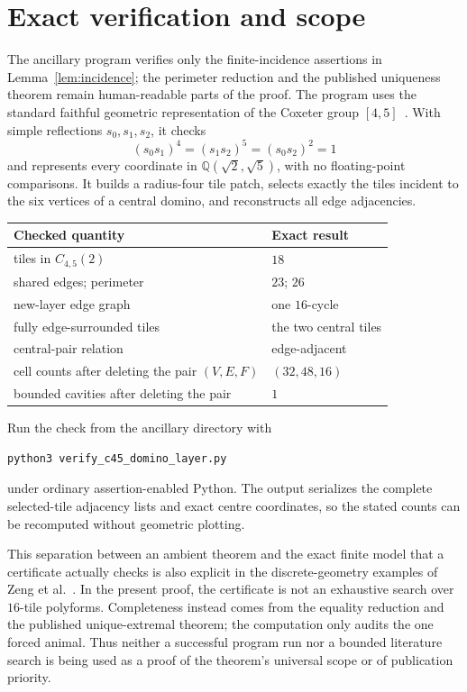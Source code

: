 \documentclass[11pt]{article}
\begin{document}
\section{Exact verification and scope}

The ancillary program  verifies only
the finite-incidence assertions in Lemma~\ref{lem:incidence}; the perimeter
reduction and the published uniqueness theorem remain human-readable parts
of the proof.  The program uses the standard faithful geometric
representation of the Coxeter group $[4,5]$~\cite[Chapter~5]{Humphreys1990}.
With simple reflections $s_0,s_1,s_2$, it checks
\[
 (s_0s_1)^4=(s_1s_2)^5=(s_0s_2)^2=1
\]
and represents every coordinate in
$\mathbb Q(\sqrt2,\sqrt5)$, with no floating-point comparisons.  It builds
a radius-four tile patch, selects exactly the tiles incident to the six
vertices of a central domino, and reconstructs all edge adjacencies.

\begin{center}
\begin{tabular}{@{}ll@{}}
\toprule
Checked quantity & Exact result \\
\midrule
tiles in $C_{4,5}(2)$ & $18$ \\
shared edges; perimeter & $23$; $26$ \\
new-layer edge graph & one $16$-cycle \\
fully edge-surrounded tiles & the two central tiles \\
central-pair relation & edge-adjacent \\
cell counts after deleting the pair $(V,E,F)$ & $(32,48,16)$ \\
bounded cavities after deleting the pair & $1$ \\
\bottomrule
\end{tabular}
\end{center}

Run the check from the ancillary directory with
\begin{verbatim}
python3 verify_c45_domino_layer.py
\end{verbatim}
under ordinary assertion-enabled Python.  The output serializes the complete
selected-tile adjacency lists and exact centre coordinates, so the stated
counts can be recomputed without geometric plotting.

This separation between an ambient theorem and the exact finite model that
a certificate actually checks is also explicit in the discrete-geometry
examples of Zeng et al.~\cite[Sections~6--7]{ZengEtAl2026Finite}.  In the
present proof, the certificate is not an exhaustive search over
$16$-tile polyforms.  Completeness instead comes from the equality reduction
and the published unique-extremal theorem; the computation only audits the
one forced animal.  Thus neither a successful program run nor a bounded
literature search is being used as a proof of the theorem's universal scope
or of publication priority.
\end{document}
